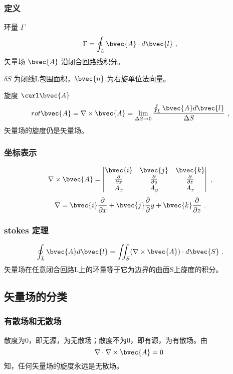 \subsubsection{定义}
环量 $\Gamma$
\begin{equation}\label{eq_VecAnl_10}
\Gamma=\oint_L \bvec{A} \cdot d \bvec{l}~,
\end{equation}
矢量场 $\bvec{A}$ 沿闭合回路线积分。

$\delta S$ 为闭线L包围面积，$\bvec{n}$ 为右旋单位法向量。

旋度 $\curl\bvec{A}$
\begin{equation}\label{eq_VecAnl_11}
rot \bvec{A}=\nabla \times \bvec{A}=\lim_{\Delta S \to 0} \frac{\oint_L \bvec{A} d\bvec{l}}{\Delta S}~,
\end{equation}
矢量场的旋度仍是矢量场。

\subsubsection{坐标表示}
\begin{equation}\label{eq_VecAnl_12}
\nabla \times \bvec{A}=
\begin{vmatrix}
\bvec{i} & \bvec{j} & \bvec{k} \\
\frac{\partial}{\partial x} & \frac{\partial}{\partial y} & \frac{\partial}{\partial z}\\
A_x & A_y & A_z
\end{vmatrix}~,
\end{equation}
\begin{equation}\label{eq_VecAnl_13}
\nabla = \bvec{i}\frac{\partial}{\partial x}+ \bvec{j} \frac{\partial}{\partial}y + \bvec{k} \frac{\partial}{\partial z}~.
\end{equation}

\subsubsection{stokes 定理}
\begin{equation}\label{eq_VecAnl_14}
\oint_L \bvec{A} d\bvec{l}=\iint_S (\nabla \times \bvec{A})\cdot d\bvec{S}~.
\end{equation}
矢量场在任意闭合回路L上的环量等于它为边界的曲面S上旋度的积分。

\subsection{矢量场的分类}
\subsubsection{有散场和无散场}
散度为0，即无源，为无散场；散度不为0，即有源，为有散场。由
\begin{equation}\label{eq_VecAnl_24}
\nabla\cdot\nabla\times\bvec{A}=0~
\end{equation}
知，任何矢量场的旋度永远是无散场。

